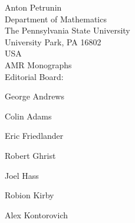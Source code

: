 \documentclass[twoside]{book}
\begin{document}
\noindent
Anton Petrunin\\
Department of Mathematics\\
The Pennsylvania State University\\
University Park, PA 16802\\
USA\\[20mm]
\noindent
AMR Monographs\\
Editorial Board:

\qquad George Andrews

\qquad Colin Adams

\qquad 
Eric Friedlander

\qquad 
Robert Ghrist

\qquad 
Joel Hass

\qquad 
Robion Kirby

\qquad 
Alex Kontorovich
\end{document}
